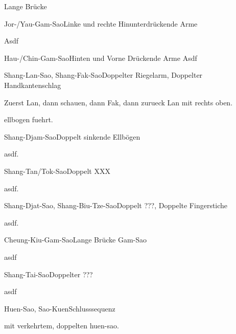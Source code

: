 \begin{WTSatz}{Lange Br\"ucke}%

	
	\begin{WTSatzTeil}{Jor-/Yau-Gam-Sao}{Linke und rechte Hinunterdr\"uckende Arme}
		
		Asdf
	\end{WTSatzTeil}
	\begin{WTSatzTeil}{Hau-/Chin-Gam-Sao}{Hinten und Vorne Dr\"uckende Arme}
		Asdf
	\end{WTSatzTeil}
	\begin{WTSatzTeil}{Shang-Lan-Sao, Shang-Fak-Sao}{Doppelter Riegelarm, Doppelter Handkantenschlag}
		
		Zuerst Lan, dann schauen, dann Fak, dann zurueck Lan mit rechts oben.
		
		ellbogen fuehrt.
	\end{WTSatzTeil}
	\begin{WTSatzTeil}{Shang-Djam-Sao}{Doppelt sinkende Ellb\"ogen}
		
		asdf.
	\end{WTSatzTeil}
	\begin{WTSatzTeil}{Shang-Tan/Tok-Sao}{Doppelt XXX}
		
		asdf.
	\end{WTSatzTeil}
	\begin{WTSatzTeil}{Shang-Djat-Sao, Shang-Biu-Tze-Sao}{Doppelt ???, Doppelte Fingerstiche}
		
		asdf.
	\end{WTSatzTeil}
	\begin{WTSatzTeil}{Cheung-Kiu-Gam-Sao}{Lange Br\"ucke Gam-Sao}
		
		asdf
	\end{WTSatzTeil}
	\begin{WTSatzTeil}{Shang-Tai-Sao}{Doppelter ???}
		
		asdf
	\end{WTSatzTeil}
	\begin{WTSatzTeil}{Huen-Sao, Sao-Kuen}{Schlusssequenz}
		
		mit verkehrtem, doppelten huen-sao.
	\end{WTSatzTeil}
\end{WTSatz}

